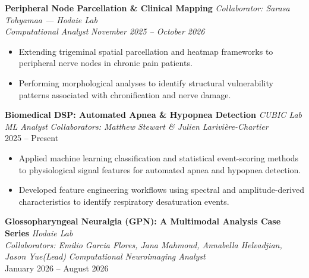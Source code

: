 \documentclass[11pt, letterpaper]{article}
\newcommand{\cventry}[4]{
    \noindent\textbf{#1} \hfill \textit{#2} \\
    \textit{#3} \hfill \textit{\small #4} \\
    \vspace{-4pt}
}
\begin{document}
\cventry{Peripheral Node Parcellation \& Clinical Mapping}{Collaborator: Sarasa Tohyamaa --- Hodaie Lab}{Computational Analyst}{November 2025 -- October 2026}

\begin{itemize}[leftmargin=1.5em, topsep=2pt, itemsep=2pt]
    \item Extending trigeminal spatial parcellation and heatmap frameworks to peripheral nerve nodes in chronic pain patients.

    \item Performing morphological analyses to identify structural vulnerability patterns associated with chronification and nerve damage.
\end{itemize}


\vspace{4pt}

\cventry{Biomedical DSP: Automated Apnea \& Hypopnea Detection}{CUBIC Lab}{ML Analyst}{Collaborators: Matthew Stewart \& Julien Larivière-Chartier}{2025 -- Present}

\begin{itemize}[leftmargin=1.5em, topsep=2pt, itemsep=2pt]
    \item Applied machine learning classification and statistical event-scoring methods to physiological signal features for automated apnea and hypopnea detection.

    \item Developed feature engineering workflows using spectral and amplitude-derived characteristics to identify respiratory desaturation events.
\end{itemize}

\vspace{4pt}

\cventry{Glossopharyngeal Neuralgia (GPN): A Multimodal Analysis Case Series }{Hodaie Lab}{Collaborators: Emilio Garcia Flores, Jana Mahmoud, Annabella Helvadjian, Jason Yue(Lead)}{Computational Neuroimaging Analyst}{January 2026 -- August 2026}
\end{document}

